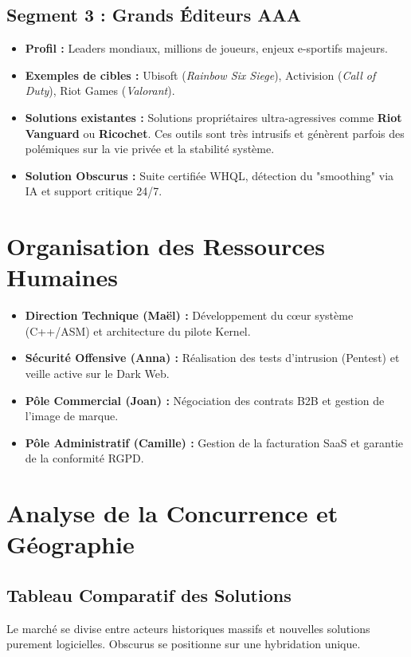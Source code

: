 \documentclass[12pt,a4paper]{article}
\begin{document}
\subsection{Segment 3 : Grands Éditeurs AAA}
\begin{itemize}
    \item \textbf{Profil :} Leaders mondiaux, millions de joueurs, enjeux e-sportifs majeurs.
    \item \textbf{Exemples de cibles :} Ubisoft (\textit{Rainbow Six Siege}), Activision (\textit{Call of Duty}), Riot Games (\textit{Valorant}).
    \item \textbf{Solutions existantes :} Solutions propriétaires ultra-agressives comme \textbf{Riot Vanguard} ou \textbf{Ricochet}. Ces outils sont très intrusifs et génèrent parfois des polémiques sur la vie privée et la stabilité système.
    \item \textbf{Solution Obscurus :} Suite certifiée WHQL, détection du "smoothing" via IA et support critique 24/7.
\end{itemize}

\section{Organisation des Ressources Humaines}
\begin{itemize}
    \item \textbf{Direction Technique (Maël) :} Développement du cœur système (C++/ASM) et architecture du pilote Kernel.
    \item \textbf{Sécurité Offensive (Anna) :} Réalisation des tests d'intrusion (Pentest) et veille active sur le Dark Web.
    \item \textbf{Pôle Commercial (Joan) :} Négociation des contrats B2B et gestion de l'image de marque.
    \item \textbf{Pôle Administratif (Camille) :} Gestion de la facturation SaaS et garantie de la conformité RGPD.
\end{itemize}

\section{Analyse de la Concurrence et Géographie}

\subsection{Tableau Comparatif des Solutions}
Le marché se divise entre acteurs historiques massifs et nouvelles solutions purement logicielles. Obscurus se positionne sur une hybridation unique.
\end{document}

